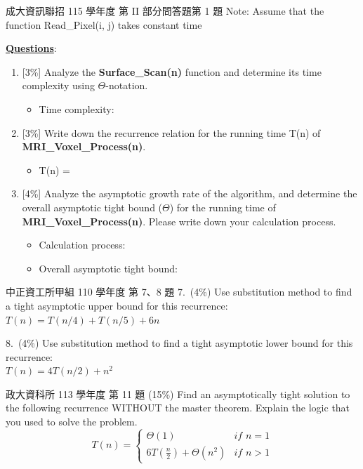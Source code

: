 \begin{pastexam}[label={px:rec-1}]{成大資訊聯招 115 學年度 第 II 部分問答題第 1 題}
Note: Assume that the function Read\_Pixel(i, j) takes constant time

\underline{\textbf{Questions}}:
\begin{enumerate}[label=(\arabic*)]
\item {[3\%]} Analyze the \textbf{Surface\_Scan(n)} function and determine its time
complexity using $\Theta$-notation.
\begin{itemize}\item Time complexity: \underline{\hspace{5cm}}\end{itemize}
\item {[3\%]} Write down the recurrence relation for the running time T(n) of
\textbf{MRI\_Voxel\_Process(n)}.
\begin{itemize}\item T(n) = \underline{\hspace{5cm}}\end{itemize}
\item {[4\%]} Analyze the asymptotic growth rate of the algorithm, and determine the
overall asymptotic tight bound ($\Theta$) for the running time of
\textbf{MRI\_Voxel\_Process(n)}. Please write down your calculation process.
\begin{itemize}
\item Calculation process: \underline{\hspace{5cm}}
\item Overall asymptotic tight bound: \underline{\hspace{4cm}}
\end{itemize}
\end{enumerate}
\end{pastexam}

\begin{pastexam}[label={px:rec-2}]{中正資工所甲組 110 學年度 第 7、8 題}
7.\ (4\%) Use substitution method to find a tight asymptotic upper bound for this
recurrence:\\
$T(n)=T(n/4)+T(n/5)+6n$

8.\ (4\%) Use substitution method to find a tight asymptotic lower bound for this
recurrence:\\
$T(n)=4T(n/2)+n^2$
\end{pastexam}

\begin{pastexam}[label={px:rec-3}]{政大資科所 113 學年度 第 11 題}
(15\%) Find an asymptotically tight solution to the following recurrence WITHOUT the
master theorem. Explain the logic that you used to solve the problem.
\[
T(n)=\begin{cases}\Theta(1) & \textit{if } n=1\\ 6T\left(\frac{n}{2}\right)+\Theta(n^2)
& \textit{if } n>1\end{cases}
\]
\end{pastexam}

